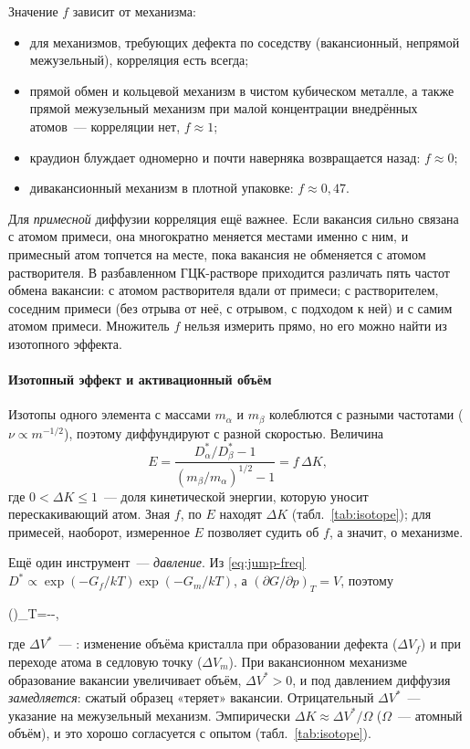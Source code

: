 Значение $f$ зависит от механизма:
\begin{itemize}
\item для механизмов, требующих дефекта по соседству (вакансионный,
непрямой межузельный), корреляция есть всегда;
\item прямой обмен и кольцевой механизм в чистом кубическом металле, а
также прямой межузельный механизм при малой концентрации внедрённых
атомов~— корреляции нет, $f\approx1$;
\item краудион блуждает одномерно и почти наверняка возвращается назад:
$f\approx0$;
\item дивакансионный механизм в плотной упаковке: $f\approx0{,}47$.
\end{itemize}
Для \emph{примесной} диффузии корреляция ещё важнее. Если вакансия
сильно связана с атомом примеси, она многократно меняется местами
именно с ним, и примесный атом топчется на месте, пока вакансия не
обменяется с атомом растворителя. В разбавленном ГЦК-растворе
приходится различать пять частот обмена вакансии: с атомом
растворителя вдали от примеси; с растворителем, соседним примеси (без
отрыва от неё, с отрывом, с подходом к ней) и с самим атомом примеси.
Множитель $f$ нельзя измерить прямо, но его можно найти из изотопного
эффекта.

\paragraph{Изотопный эффект и активационный объём}
Изотопы одного элемента с массами $m_\alpha$ и $m_\beta$ колеблются с
разными частотами ($\nu\propto m^{-1/2}$), поэтому диффундируют с
разной скоростью. Величина 
\begin{equation}\label{eq:isotope}
E=\frac{D_\alpha^*/D_\beta^*-1}{(m_\beta/m_\alpha)^{1/2}-1}=f\,\Delta K ,
\end{equation}
где $0<\Delta K\le1$~— доля кинетической энергии, которую уносит
перескакивающий атом. Зная $f$, по $E$ находят $\Delta K$
(табл.~\ref{tab:isotope}); для примесей, наоборот, измеренное $E$
позволяет судить об $f$, а значит, о механизме.

Ещё один инструмент~— \emph{давление}. Из \eqref{eq:jump-freq}
$D^*\propto\exp(-G_f/kT)\exp(-G_m/kT)$, а $(\partial G/\partial p)_T=V$, поэтому
\begin{keyeq}\label{eq:act-volume}
\left(\right)_T=-\equiv-,
\end{keyeq}
где $\Delta V^*$~— : изменение объёма
кристалла при образовании дефекта ($\Delta V_f$) и при переходе атома в
седловую точку ($\Delta V_m$). При вакансионном механизме образование
вакансии увеличивает объём, $\Delta V^*>0$, и под давлением диффузия
\emph{замедляется}: сжатый образец «теряет» вакансии. Отрицательный
$\Delta V^*$~— указание на межузельный механизм. Эмпирически
$\Delta K\approx\Delta V^*/\Omega$ ($\Omega$~— атомный объём), и это
хорошо согласуется с опытом (табл.~\ref{tab:isotope}).

